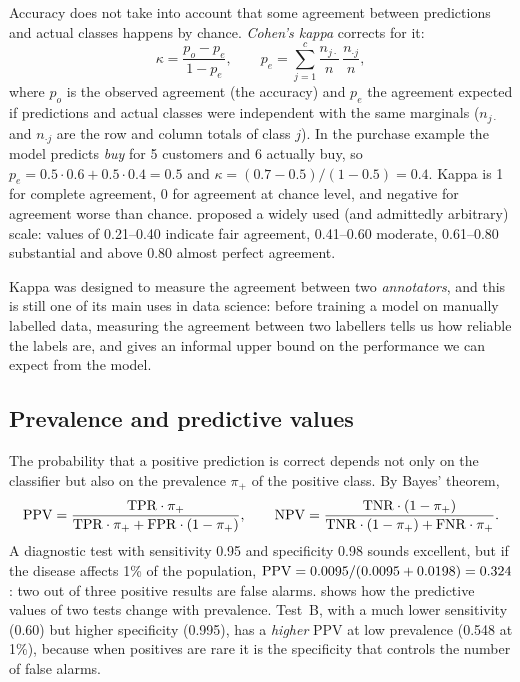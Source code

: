 Accuracy does not take into account that some agreement between predictions and actual
classes happens by chance. \emph{Cohen's kappa} \citep{cohen1960coefficient} corrects for it:
\begin{equation}
  \kappa=\frac{p_o-p_e}{1-p_e},
  \qquad
  p_e=\sum_{j=1}^{c}\frac{n_{j\cdot}}{n}\,\frac{n_{\cdot j}}{n},
\end{equation}
where $p_o$ is the observed agreement (the accuracy) and $p_e$ the agreement expected if
predictions and actual classes were independent with the same marginals ($n_{j\cdot}$ and
$n_{\cdot j}$ are the row and column totals of class $j$). In the purchase example the model
predicts \emph{buy} for 5 customers and 6 actually buy, so
$p_e=0.5\cdot0.6+0.5\cdot0.4=0.5$ and $\kappa=(0.7-0.5)/(1-0.5)=0.4$. Kappa is 1 for complete
agreement, 0 for agreement at chance level, and negative for agreement worse than chance.
\citet{landis1977measurement} proposed a widely used (and admittedly arbitrary) scale: values
of 0.21--0.40 indicate fair agreement, 0.41--0.60 moderate, 0.61--0.80 substantial and above
0.80 almost perfect agreement.

Kappa was designed to measure the agreement between two \emph{annotators}, and this is still
one of its main uses in data science: before training a model on manually labelled data,
measuring the agreement between two labellers tells us how reliable the labels are, and
gives an informal upper bound on the performance we can expect from the model.

\subsection{Prevalence and predictive values}

The probability that a positive prediction is correct depends not only on the classifier but
also on the prevalence $\pi_+$ of the positive class. By Bayes' theorem,
\begin{equation}\label{eq:ppv}
  \mathrm{PPV}=\frac{\mathrm{TPR}\cdot\pi_+}{\mathrm{TPR}\cdot\pi_++\mathrm{FPR}\cdot(1-\pi_+)},
  \qquad
  \mathrm{NPV}=\frac{\mathrm{TNR}\cdot(1-\pi_+)}{\mathrm{TNR}\cdot(1-\pi_+)+\mathrm{FNR}\cdot\pi_+}.
\end{equation}
A diagnostic test with sensitivity 0.95 and specificity 0.98 sounds excellent, but if the
disease affects 1\% of the population, $\mathrm{PPV}=0.0095/(0.0095+0.0198)=0.324$: two out of three
positive results are false alarms.  shows how the predictive values of two
tests change with prevalence. Test~B, with a much lower sensitivity (0.60) but higher
specificity (0.995), has a \emph{higher} PPV at low prevalence (0.548 at 1\%), because when
positives are rare it is the specificity that controls the number of false alarms.

